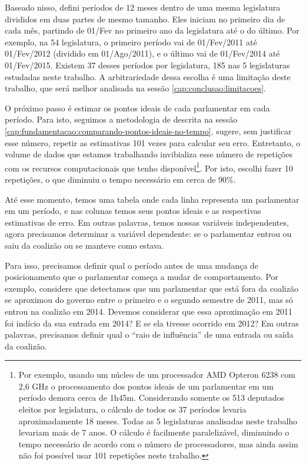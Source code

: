 \documentclass[a4paper,titlepage]{ppgi}\usepackage[]{graphicx}\usepackage[]{color}
\begin{document}
Baseado nisso, defini períodos de 12 meses dentro de uma mesma legislatura
divididos em duas partes de mesmo tamanho. Eles iniciam no primeiro dia de cada
mês, partindo de 01/Fev no primeiro ano da legislatura até o do último. Por
exemplo, na 54\textordfeminine{} legislatura, o primeiro período vai de
01/Fev/2011 até 01/Fev/2012 (dividido em 01/Ago/2011), e o último vai de
01/Fev/2014 até 01/Fev/2015. Existem 37 desses períodos por legislatura, 185
nas 5 legislaturas estudadas neste trabalho. A arbitrariedade dessa escolha é
uma limitação deste trabalho, que será melhor analisada na sessão
\ref{cap:conclusao:limitacoes}.

O próximo passo é estimar os pontos ideais de cada parlamentar em cada período.
Para isto, seguimos a metodologia de  descrita na sessão
\ref{cap:fundamentacao:comparando-pontos-ideais-no-tempo}.
\citeauthor{Poole2005} sugere, sem justificar esse número, repetir as
estimativas 101 vezes para calcular seu erro. Entretanto, o volume de dados que
estamos trabalhando invibializa esse número de repetições com os recursos
computacionais que tenho disponível\footnote{Por exemplo, usando um núcleo de
um processador AMD Opteron\texttrademark{} 6238 com 2,6 GHz o processamento dos
pontos ideais de um parlamentar em um período demora cerca de 1h45m.
Considerando somente os 513 deputados eleitos por legislatura, o cálculo de
todos os 37 períodos levaria aproximadamente 18 meses. Todas as 5 legislaturas
analisadas neste trabalho levariam mais de 7 anos. O cálculo é facilmente
paralelizável, diminuindo o tempo necessário de acordo com o número de
processadores, mas ainda assim não foi possível usar 101 repetições neste
trabalho.}. Por isto, escolhi fazer 10 repetições, o que diminuiu o tempo
necessário em cerca de 90\%.

Até esse momento, temos uma tabela onde cada linha representa um parlamentar em
um período, e nas colunas temos seus pontos ideais e as respectivas estimativas
de erro. Em outras palavras, temos nossas variáveis independentes, agora
precisamos determinar a variável dependente: se o parlamentar entrou ou saiu da
coalizão ou se manteve como estava.

Para isso, precisamos definir qual o período antes de uma mudança de
posicionamento que o parlamentar começa a mudar de comportamento. Por exemplo,
considere que detectamos que um parlamentar que está fora da coalizão se
aproximou do governo entre o primeiro e o segundo semestre de 2011, mas só
entrou na coalizão em 2014. Devemos considerar que essa aproximação em 2011 foi
indício da sua entrada em 2014? E se ela tivesse ocorrido em 2012?  Em outras
palavras, precisamos definir qual o ``raio de influência'' de uma entrada ou
saída da coalizão.
\end{document}
